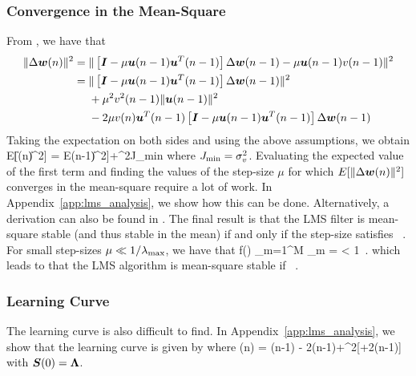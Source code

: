 \subsubsection{Convergence in the Mean-Square}
From , we have that
\begin{align}
  \|\Delta\boldsymbol{w}(n)\|^2={}& \|\left[\boldsymbol{I}-\mu\boldsymbol{u}(n-1)\boldsymbol{u}^T(n-1)\right]\Delta\boldsymbol{w}(n-1)-\mu\boldsymbol{u}(n-1)v(n-1)\|^2\notag\\
  ={}& \|\left[\boldsymbol{I}-\mu\boldsymbol{u}(n-1)\boldsymbol{u}^T(n-1)\right]\Delta\boldsymbol{w}(n-1)\|^2\notag\\
  &{}+\mu^2v^2(n-1)\|\boldsymbol{u}(n-1)\|^2\notag\\
  &{}-2\mu v(n) \boldsymbol{u}^T(n-1)\left[\boldsymbol{I}-\mu\boldsymbol{u}(n-1)\boldsymbol{u}^T(n-1)\right]\Delta\boldsymbol{w}(n-1)
\end{align}
Taking the expectation on both sides and using the above assumptions, we obtain
\bmath
  E[\|\Delta{}(n)\|^2] = E\left[\|\left[\vect{I}-\mu\vect{u}(n-1)\vect{u}^T(n-1)\right]\Delta{}(n-1)\|^2\right]+\mu^2J_\textup{min}\tr{\vect{\Lambda}}
\emath
where $J_\textup{min}=\sigma_v^2$. Evaluating the expected value of the first term and finding the values of the step-size $\mu$ for which $E[\|\Delta\boldsymbol{w}(n)\|^2]$ converges in the mean-square require a lot of work. In Appendix~\ref{app:lms_analysis}, we show how this can be done. Alternatively, a derivation can also be found in \cite[pp.~452--465]{Sayed2003}. The final result is that the LMS filter is mean-square stable (and thus stable in the mean) if and only if the step-size satisfies \cite[pp.~462]{Sayed2003}
\bmath
  \ .
\emath
For small step-sizes $\mu \ll 1/\lambda_\textup{max}$, we have that
\bmath
  f(\mu) \approx {}\sum_{m=1}^M \lambda_m = \tr{\vect{\Lambda}} < 1\ .
\emath
which leads to that the LMS algorithm is mean-square stable if
\bmath
  \ .
\emath

\subsubsection{Learning Curve}
The learning curve is also difficult to find. In Appendix~\ref{app:lms_analysis}, we show that the learning curve is given by
\bmath
    \label{eq:lms_learning_curve}
\emath
where
\bmath
  (n) = (n-1) - 2\mu\vect{\Lambda}(n-1)+\mu^2[\vect{\Lambda}+2\vect{\Lambda}(n-1)\vect{\Lambda}]
\emath
with $\boldsymbol{S}(0)=\boldsymbol{\Lambda}$.

